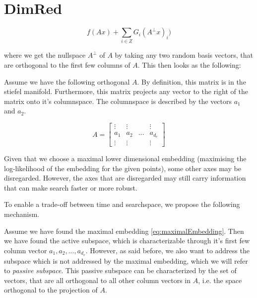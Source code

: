 \section{DimRed}

\begin{equation}
f(A x) + \sum_{i \in Z} G_i( A^{\bot} x)_i )
\label{eq:dimRedEquation}
\end{equation}

where we get the nullspace $A^{\bot}$ of $A$ by taking any two random basis vectors, that are orthogonal to the first few columns of $A$.
This then looks as the following:

Assume we have the following orthogonal $A$. By definition, this matrix is in the stiefel manifold.
Furthermore, this matrix projects any vector to the right of the matrix onto it's columnspace.
The columnspace is described by the vectors $a_1$ and $a_2$.

\begin{equation}
A = 
\begin{bmatrix}
 \vdots & \vdots & & \vdots \\
 a_1 & a_2 & ... & a_{d_e} \\
 \vdots & \vdots & & \vdots
\end{bmatrix}
\label{eq:maximalEmbedding}
\end{equation}

Given that we choose a maximal lower dimensional embedding (maximising the log-likelihood of the embedding for the given points), some other axes may be disregarded.
However, the axes that are disregarded may still carry information that can make search faster or more robust.

To enable a trade-off between time and searchspace, we propose the following mechanism.


Assume we have found the maximal embedding \ref{eq:maximalEmbedding}.
Then we have found the active subspace, which is characterizable through it's first few column vector $  a_1, a_2, ..., a_{d_e} $.
However, as said before, we also want to address the subspace which is not addressed by the maximal embedding, which we will refer to \textit{passive subspace}.
This passive subspace can be characterized by the set of vectors, that are all orthogonal to all other column vectors in $A$, i.e. the space orthogonal to the projection of $A$.

